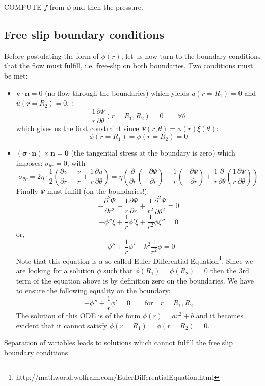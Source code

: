 COMPUTE $f$ from $\phi$ and then the pressure.


\subsection{Free slip boundary conditions}

Before postulating the form of $\phi(r)$, let us now turn to the boundary conditions that the flow must fulfill, i.e. free-slip on both boundaries.
Two conditions must be met:

\begin{itemize}
\item ${\bm v} \cdot {\bm n}=0$ (no flow through the boundaries) which yields $u(r=R_1)=0$ and $u(r=R_2)=0$, :
\[
\frac{1}{r}\frac{\partial \Psi}{\partial \theta} (r=R_1,R_2)=0   \quad\quad \forall \theta
\]
which gives us the first constraint since $\Psi(r,\theta)=\phi(r)\xi(\theta)$:
\[
\phi(r=R_1)=\phi(r=R_2)=0  
\]
\item $({\bm \sigma} \cdot {\bm n}) \times {\bm n} = {\bm 0} $  (the tangential stress at the boundary is zero)
which imposes: $\sigma_{\theta r}=0$, with
\[
\sigma_{\theta r}=
2 \eta \cdot \frac{1}{2} \left( \frac{\partial v}{\partial r} - \frac{v}{r} + \frac{1}{r} \frac{\partial u}{\partial \theta}    \right)
= \eta \left( \frac{\partial }{\partial r} (- \frac{\partial \Psi}{\partial r}) -
\frac{1}{r} (- \frac{\partial \Psi}{\partial r}) + \frac{1}{r} \frac{\partial }{\partial \theta} (\frac{1}{r}\frac{\partial \Psi}{\partial \theta})    \right)
\]
Finally $\Psi$ must fulfill (on the boundaries!):
\[
-\frac{\partial^2 \Psi}{\partial r^2} + \frac{1}{r}  \frac{\partial \Psi}{\partial r} + \frac{1}{r^2} \frac{\partial^2 \Psi}{\partial \theta^2}=0
\]
\[
- \phi'' \xi + \frac{1}{r} \phi' \xi +  \frac{1}{r^2}  \phi \xi'' = 0
\]
or, 
\[
- \phi''  + \frac{1}{r} \phi'  -k^2  \frac{1}{r^2}  \phi  = 0
\]
Note that this equation is a so-called Euler Differential 
Equation\footnote{http://mathworld.wolfram.com/EulerDifferentialEquation.html}.
Since we are looking for a solution $\phi$ such that $\phi(R_1)=\phi(R_2)=0 $ then 
the 3rd term of the equation above is by definition zero on the boundaries.
We have to ensure the following equality on the boundary:
\[
- \phi''  + \frac{1}{r} \phi'   = 0\quad\quad \text{for} \quad r=R_1,R_2
\]
The solution of this ODE is of the form $\phi(r)=ar^2+b$ and it becomes 
evident that it cannot satisfy $\phi(r=R_1)=\phi(r=R_2)=0$.




\end{itemize}

{\color{red} Separation of variables leads to solutions which cannot fulfill the free slip 
boundary conditions}








